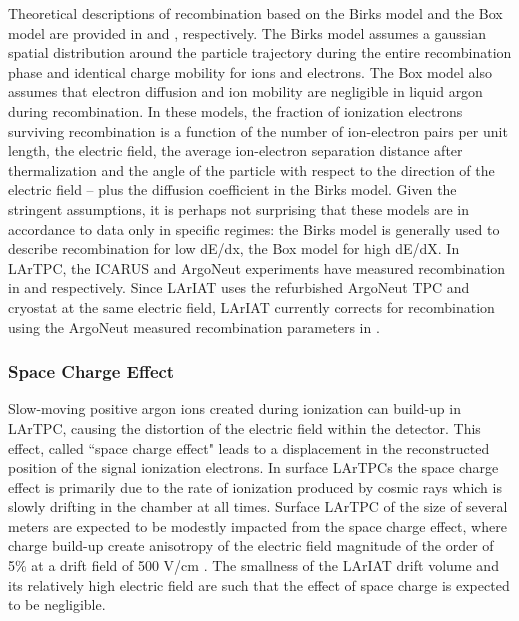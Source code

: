 Theoretical descriptions of recombination based on the Birks model and the Box model are provided in \cite{0370-1298-64-10-303} and  \cite{PhysRevA.36.614}, respectively. The Birks model assumes a gaussian spatial distribution around the particle trajectory during the entire recombination phase and identical charge mobility for ions and electrons. The Box model also assumes that electron diffusion and ion mobility are negligible in liquid argon during recombination.
In these models, the fraction of ionization electrons surviving recombination is a function of the number of ion-electron pairs per unit length, the electric field, the average ion-electron separation distance after thermalization and the angle of the particle with respect to the direction of the electric field -- plus the diffusion coefficient in the Birks model. Given the stringent assumptions, it is perhaps  not surprising that these models are in accordance to data only in specific regimes: the Birks model is generally used to describe recombination for low dE/dx, the Box model for high dE/dX.
In LArTPC, the ICARUS and ArgoNeut experiments have measured recombination in \cite{Amoruso:2004dy} and \cite{1748-0221-8-08-P08005} respectively. Since LArIAT uses the refurbished ArgoNeut TPC and cryostat at the same electric field,  LArIAT currently corrects for recombination using the ArgoNeut measured recombination parameters in \cite{1748-0221-8-08-P08005}.


\subsubsection{Space Charge Effect}
Slow-moving positive argon ions created during ionization can build-up in LArTPC, causing the distortion of the
electric field within the detector. This effect, called  ``space charge effect" leads to a displacement in the reconstructed position of the signal ionization electrons. In surface LArTPCs the space charge effect is primarily due to the rate of ionization produced by cosmic rays which is slowly drifting in the chamber at all times. Surface LArTPC of the size of several meters are expected to be modestly impacted from the space charge effect, where charge build-up create anisotropy of the electric field magnitude of the order of  5\% at a drift field of 500 V/cm \cite{SpaceCharge}. The smallness of the LArIAT drift volume and its relatively high electric field are such that the effect of  space charge is expected to be negligible. 

